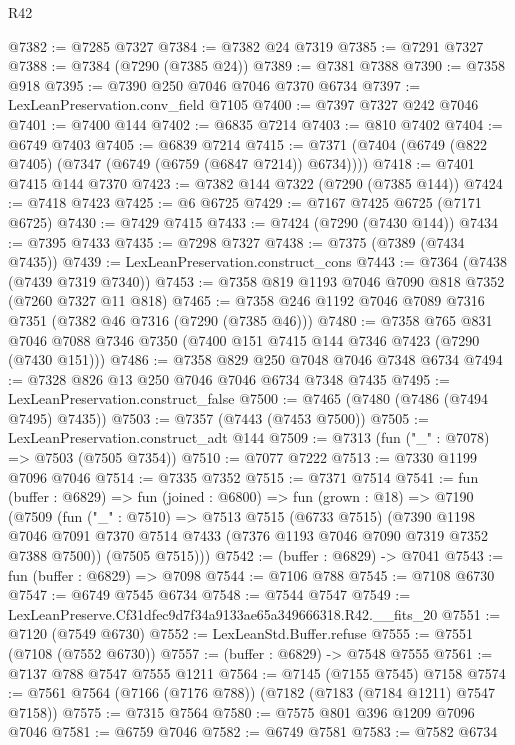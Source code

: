 \begin{lexlean}{R42}
\begin{coremodule}
{@7382 := @7285 @7327
@7384 := @7382 @24 @7319
@7385 := @7291 @7327
@7388 := @7384 (@7290 (@7385 @24))
@7389 := @7381 @7388
@7390 := @7358 @918
@7395 := @7390 @250 @7046 @7046 @7370 @6734
@7397 := LexLeanPreservation.conv_field @7105
@7400 := @7397 @7327 @242 @7046
@7401 := @7400 @144
@7402 := @6835 @7214
@7403 := @810 @7402
@7404 := @6749 @7403
@7405 := @6839 @7214
@7415 := @7371 (@7404 (@6749 (@822 @7405) (@7347 (@6749 (@6759 (@6847 @7214)) @6734))))
@7418 := @7401 @7415 @144 @7370
@7423 := @7382 @144 @7322 (@7290 (@7385 @144))
@7424 := @7418 @7423
@7425 := @6 @6725
@7429 := @7167 @7425 @6725 (@7171 @6725)
@7430 := @7429 @7415
@7433 := @7424 (@7290 (@7430 @144))
@7434 := @7395 @7433
@7435 := @7298 @7327
@7438 := @7375 (@7389 (@7434 @7435))
@7439 := LexLeanPreservation.construct_cons
@7443 := @7364 (@7438 (@7439 @7319 @7340))
@7453 := @7358 @819 @1193 @7046 @7090 @818 @7352 (@7260 @7327 @11 @818)
@7465 := @7358 @246 @1192 @7046 @7089 @7316 @7351 (@7382 @46 @7316 (@7290 (@7385 @46)))
@7480 := @7358
    @765
    @831
    @7046
    @7088
    @7346
    @7350
    (@7400 @151 @7415 @144 @7346 @7423 (@7290 (@7430 @151)))
@7486 := @7358 @829 @250 @7048 @7046 @7348 @6734
@7494 := @7328 @826 @13 @250 @7046 @7046 @6734 @7348 @7435
@7495 := LexLeanPreservation.construct_false
@7500 := @7465 (@7480 (@7486 (@7494 @7495) @7435))
@7503 := @7357 (@7443 (@7453 @7500))
@7505 := LexLeanPreservation.construct_adt @144
@7509 := @7313 (fun ("_" : @7078) => @7503 (@7505 @7354))
@7510 := @7077 @7222
@7513 := @7330 @1199 @7096 @7046
@7514 := @7335 @7352
@7515 := @7371 @7514
@7541 := fun (buffer : @6829) =>
  fun (joined : @6800) =>
  fun (grown : @18) =>
  @7190
    (@7509
      (fun ("_" : @7510) =>
      @7513
        @7515
        (@6733 @7515)
        (@7390
          @1198
          @7046
          @7091
          @7370
          @7514
          @7433
          (@7376 @1193 @7046 @7090 @7319 @7352 @7388 @7500))
        (@7505 @7515)))
@7542 := (buffer : @6829) -> @7041
@7543 := fun (buffer : @6829) => @7098
@7544 := @7106 @788
@7545 := @7108 @6730
@7547 := @6749 @7545 @6734
@7548 := @7544 @7547
@7549 := LexLeanPreserve.Cf31dfec9d7f34a9133ae65a349666318.R42.__fits_20
@7551 := @7120 (@7549 @6730)
@7552 := LexLeanStd.Buffer.refuse
@7555 := @7551 (@7108 (@7552 @6730))
@7557 := (buffer : @6829) -> @7548 @7555
@7561 := @7137 @788 @7547 @7555 @1211
@7564 := @7145 (@7155 @7545) @7158
@7574 := @7561 @7564 (@7166 (@7176 @788)) (@7182 (@7183 (@7184 @1211) @7547 @7158))
@7575 := @7315 @7564
@7580 := @7575 @801 @396 @1209 @7096 @7046
@7581 := @6759 @7046
@7582 := @6749 @7581
@7583 := @7582 @6734
}
\end{coremodule}
\end{lexlean}
